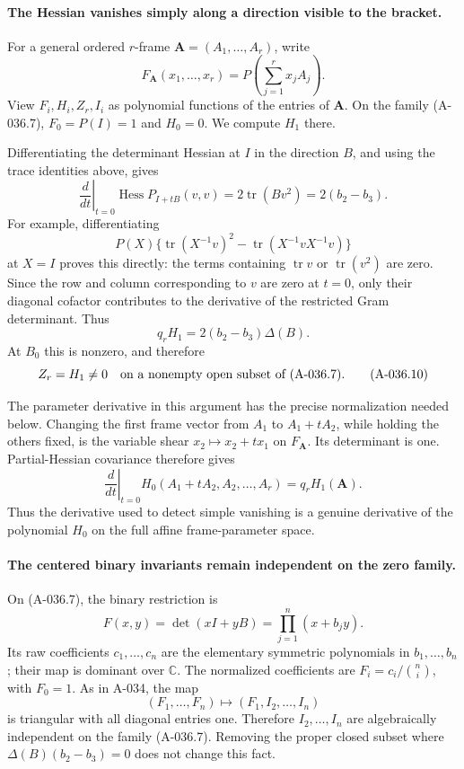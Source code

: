\paragraph{The Hessian vanishes simply along a direction visible to the bracket.}
For a general ordered \(r\)-frame
\(\mathbf A=(A_1,\ldots,A_r)\), write
\[
 F_{\mathbf A}(x_1,\ldots,x_r)
                   =P\left(\sum_{j=1}^r x_j A_j\right).
 \]
View \(F_i,H_i,Z_r,I_i\) as polynomial functions of
the entries of \(\mathbf A\).
On the family (A-036.7), \(F_0=P(I)=1\) and \(H_0=0\).
We compute \(H_1\) there.

Differentiating the determinant Hessian at \(I\) in
the direction \(B\), and using the trace identities
above, gives
\[
       \left.\frac{d}{dt}\right|_{t=0}
              \operatorname{Hess}P_{I+tB}(v,v)
             =2\operatorname{tr}(Bv^2)=2(b_2-b_3).
                                                               \tag{A-036.8}
\]
For example, differentiating
\[
 P(X)\{\operatorname{tr}(X^{-1}v)^2
                         -\operatorname{tr}(X^{-1}vX^{-1}v)\}
\]
at \(X=I\) proves this directly: the terms containing
\(\operatorname{tr}v\) or \(\operatorname{tr}(v^2)\)
are zero.
Since the row and column corresponding to \(v\)
are zero at \(t=0\), only their diagonal cofactor
contributes to the derivative of the restricted
Gram determinant. Thus
\[
                  q_r H_1=2(b_2-b_3)\Delta(B).
                                                               \tag{A-036.9}
\]
At \(B_0\) this is nonzero, and therefore
\[
                  Z_r=H_1\ne0
          \quad\hbox{on a nonempty open subset of (A-036.7)}.
                                                               \tag{A-036.10}
\]

The parameter derivative in this argument has the
precise normalization needed below.
Changing the first frame vector from \(A_1\) to
\(A_1+tA_2\), while holding the others fixed, is
the variable shear \(x_2\mapsto x_2+t x_1\) on
\(F_{\mathbf A}\). Its determinant is one.
Partial-Hessian covariance therefore gives
\[
 \left.\frac{d}{dt}\right|_{t=0}
        H_0(A_1+tA_2,A_2,\ldots,A_r)=q_r H_1(\mathbf A).
                                                               \tag{A-036.11}
\]
Thus the derivative used to detect simple vanishing
is a genuine derivative of the polynomial \(H_0\)
on the full affine frame-parameter space.

\paragraph{The centered binary invariants remain independent on the zero family.}
On (A-036.7), the binary restriction is
\[
                 F(x,y)=\det(xI+yB)=\prod_{j=1}^n(x+b_jy).
 \]
Its raw coefficients \(c_1,\ldots,c_n\) are the
elementary symmetric polynomials in \(b_1,\ldots,b_n\);
their map is dominant over \(\mathbb C\).
The normalized coefficients are
\(F_i=c_i/\binom ni\), with \(F_0=1\).
As in A-034, the map
\[
       (F_1,\ldots,F_n)\longmapsto(F_1,I_2,\ldots,I_n)
 \]
is triangular with all diagonal entries one.
Therefore \(I_2,\ldots,I_n\) are algebraically
independent on the family (A-036.7).
Removing the proper closed subset where
\(\Delta(B)(b_2-b_3)=0\) does not change this fact.

